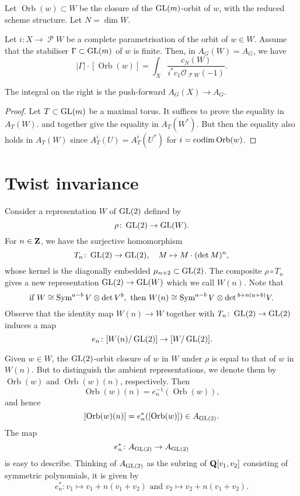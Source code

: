 \documentclass{amsart}
\DeclareMathOperator{\Orb}{Orb}
\DeclareMathOperator{\sP}{\mathscr P}
\renewcommand{\O}{\mathcal O}
\begin{document}
Let \(\Orb(w) \subset W\) be the closure of the \(\operatorname{GL}(m)\)-orbit of \(w\), with the reduced scheme structure.
Let \(N = \dim W\).
\begin{proposition}
  \label{prop:weightedformula}
  Let \(i \colon X \to \sP W\) be a complete parametrisation of the orbit of \(w \in W\).
  Assume that the stabiliser \(\Gamma \subset \operatorname{GL}(m)\) of \(w\) is finite.
  Then, in \(A_{G}(W) = A_{G}\), we have
  \[
    |\Gamma| \cdot [\Orb(w)] = \int_{X} \frac{c_{N}(W)}{i^{*}c_1\O_{\sP W}(-1)}.
  \]
\end{proposition}
The integral on the right is the push-forward \(A_G(X) \to A_G\).
\begin{proof}
  Let \(T \subset \operatorname{GL}(m)\) be a maximal torus.
  It suffices to prove the equality in \(A_T(W)\).
   and  together give the equality in \(A_T(W^{*})\).
  But then the equality also holds in \(A_T(W)\) since \(A^i_T(U) = A^i_T(U^{*})\) for \(i = \codim \Orb(w)\).
\end{proof}

\section{Twist invariance}\label{sec:twist}
Consider a representation \(W\) of \(\operatorname{GL}(2)\) defined by
\[ \rho \colon \operatorname{GL}(2) \to \operatorname{GL}(W).\]
For \(n \in {\bf Z}\), we have the surjective homomorphism
\[ T_n \colon \operatorname{GL}(2) \to \operatorname{GL}(2), \quad M \mapsto M \cdot (\det M)^{n},\]
whose kernel is the diagonally embedded \(\mu_{n+2} \subset \operatorname{GL}(2)\).
The composite \(\rho \circ T_n\) gives a new representation \(\operatorname{GL}(2) \to \operatorname{GL}(W)\) which we call \(W(n)\).
Note that 
\begin{equation}\label{eqn:twist}
 \text{if } W \cong \operatorname{Sym}^{a-b}V \otimes \det V^b, \text{ then } W(n) \cong \operatorname{Sym}^{a-b} V \otimes \det{}^{b + n(a+b)} V.
\end{equation}
Observe that the identity map \(W(n) \to W\) together with \(T_n \colon \operatorname{GL}(2) \to \operatorname{GL}(2)\) induces a map
\[ e_n \colon [W(n)/\operatorname{GL}(2)] \to [W/\operatorname{GL}(2)].\]

Given \(w \in W\), the \(\operatorname{GL}(2)\)-orbit closure of \(w\) in \(W\) under \(\rho\) is equal to that of \(w\) in \(W(n)\).
But to distinguish the ambient representations, we denote them by \(\Orb(w)\) and \(\Orb(w)(n)\), respectively.
Then
\[ \Orb(w)(n) = e_n^{-1} (\Orb(w)),\]
and hence
\[ [\Orb(w)(n)] = e_n^{*} ([\Orb(w)]) \in A_{\GL(2)}.\]
The map
\[ e_n^{*} \colon A_{\operatorname{GL}(2)} \to A_{\operatorname{GL}(2)}\]
is easy to describe.
Thinking of \(A_{\operatorname{GL}(2)}\) as the subring of \({\bf Q}[v_1,v_2]\) consisting of symmetric polynomials, it is given by
\begin{equation}\label{eqn:twistpull}
  e_n^{*} \colon v_1 \mapsto v_1 + n(v_1+v_2) \text{ and } v_2 \mapsto v_2 + n(v_1+v_{2}).
\end{equation}
\end{document}
